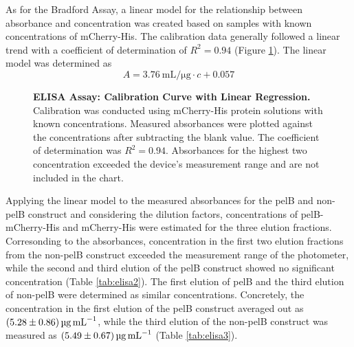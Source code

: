 \documentclass[a4paper,12pt]{article}
\begin{document}
As for the Bradford Assay, a linear model for the relationship between absorbance and concentration was created based on samples with known concentrations of mCherry-His. The calibration data generally followed a linear trend with a coefficient of determination of $R^2 = 0.94$ (Figure \ref{fig:elisa1}). The linear model was determined as 
$$A = \SI{3.76}{\milli\liter\per\micro\gram} \cdot c + 0.057$$

\begin{figure}[h!]
    \centering
    \caption{\textbf{ELISA Assay: Calibration Curve with Linear Regression. }  Calibration was conducted using mCherry-His protein solutions with known concentrations. Measured absorbances were plotted against the concentrations after subtracting the blank value. The coefficient of determination was $R^2=0.94$. Absorbances for the highest two concentration exceeded the device's measurement range and are not included in the chart.}
    \label{fig:elisa1}
\end{figure}

Applying the linear model to the measured absorbances for the pelB and non-pelB construct and considering the dilution factors, concentrations of pelB-mCherry-His and mCherry-His were estimated for the three elution fractions. Corresonding to the absorbances, concentration in the first two elution fractions from the non-pelB construct exceeded the measurement range of the photometer, while the second and third elution of the pelB construct showed no significant concentration (Table \ref{tab:elisa2}). The first elution of pelB and the third elution of non-pelB were determined as similar concentrations. Concretely, the concentration in the first elution of the pelB construct averaged out as $\SI{5.28\pm 0.86}{\micro\gram\per\milli\liter}$, while the third elution of the non-pelB construct was measured as $\SI{5.49 \pm 0.67}{\micro\gram\per\milli\liter}$ (Table \ref{tab:elisa3}).
\end{document}
